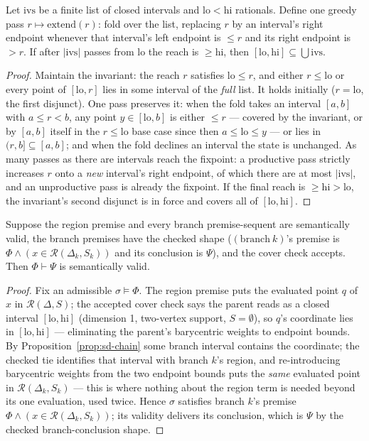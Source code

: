 \begin{bprop}\label{prop:sd-chain}
Let $\mathrm{ivs}$ be a finite list of closed intervals and
$\mathrm{lo} < \mathrm{hi}$ rationals. Define one greedy pass
$r \mapsto \mathrm{extend}(r)$: fold over the list, replacing $r$ by an
interval's right endpoint whenever that interval's left endpoint is
$\leq r$ and its right endpoint is $> r$. If after
$|\mathrm{ivs}|$ passes from $\mathrm{lo}$ the reach is
$\geq \mathrm{hi}$, then
$[\mathrm{lo}, \mathrm{hi}] \subseteq \bigcup \mathrm{ivs}$.
\end{bprop}
\begin{proof}
Maintain the invariant: the reach $r$ satisfies $\mathrm{lo} \leq r$,
and either $r \leq \mathrm{lo}$ or every point of
$[\mathrm{lo}, r]$ lies in some interval of the \emph{full} list. It
holds initially ($r = \mathrm{lo}$, the first disjunct). One pass
preserves it: when the fold takes an interval $[a, b]$ with
$a \leq r < b$, any point $y \in [\mathrm{lo}, b]$ is either
$\leq r$ --- covered by the invariant, or by $[a, b]$ itself in the
$r \leq \mathrm{lo}$ base case since then $a \leq \mathrm{lo} \leq y$
--- or lies in $(r, b] \subseteq [a, b]$; and when the fold declines an
interval the state is unchanged. As many passes as there are intervals
reach the fixpoint: a productive pass strictly increases $r$ onto a
\emph{new} interval's right endpoint, of which there are at most
$|\mathrm{ivs}|$, and an unproductive pass is already the fixpoint. If
the final reach is $\geq \mathrm{hi} > \mathrm{lo}$, the invariant's
second disjunct is in force and covers all of
$[\mathrm{lo}, \mathrm{hi}]$.
\end{proof}

\begin{bprop}\label{prop:subdiv-sound}
Suppose the region premise and every branch premise-sequent are
semantically valid, the branch premises have the checked shape
($(\mathrm{branch}\ k)$'s premise is
$\Phi \wedge (x \in \mathcal{R}(\Delta_k, S_k))$ and its conclusion is
$\Psi$), and the cover check accepts. Then $\Phi \vdash \Psi$ is
semantically valid.
\end{bprop}
\begin{proof}
Fix an admissible $\sigma \models \Phi$. The region premise puts the
evaluated point $q$ of $x$ in $\mathcal{R}(\Delta, S)$; the accepted
cover check says the parent reads as a closed interval
$[\mathrm{lo}, \mathrm{hi}]$ (dimension 1, two-vertex support,
$S = \emptyset$), so $q$'s coordinate lies in
$[\mathrm{lo}, \mathrm{hi}]$ --- eliminating the parent's barycentric
weights to endpoint bounds. By Proposition~\ref{prop:sd-chain} some
branch interval contains the coordinate; the checked tie identifies
that interval with branch $k$'s region, and re-introducing barycentric
weights from the two endpoint bounds puts the \emph{same} evaluated
point in $\mathcal{R}(\Delta_k, S_k)$ --- this is where nothing about
the region term is needed beyond its one evaluation, used twice.
Hence $\sigma$ satisfies branch $k$'s premise
$\Phi \wedge (x \in \mathcal{R}(\Delta_k, S_k))$; its validity delivers
its conclusion, which is $\Psi$ by the checked branch-conclusion
shape.
\end{proof}

